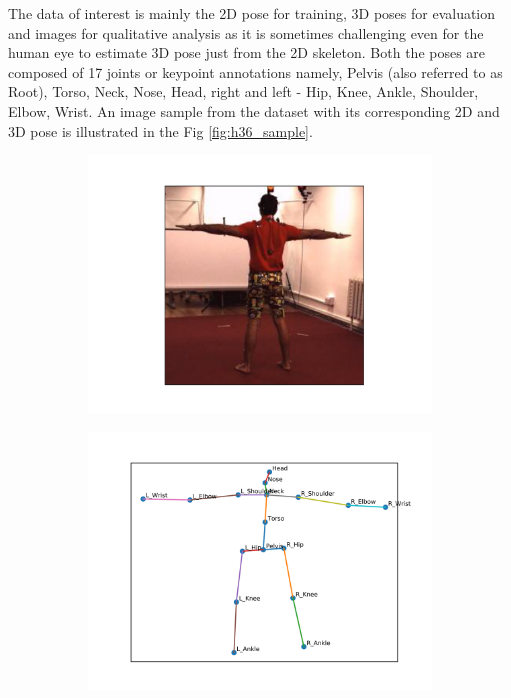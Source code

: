 The data of interest is mainly the 2D pose for training, 3D poses for evaluation and images for qualitative analysis as it is sometimes challenging even for the human eye to estimate 3D pose just from the 2D skeleton. Both the poses are composed of 17 joints or keypoint annotations namely, Pelvis (also referred to as Root), Torso, Neck, Nose, Head, right and left - Hip, Knee, Ankle, Shoulder, Elbow, Wrist. An image sample from the dataset with its corresponding 2D and 3D pose is illustrated in the Fig \ref{fig:h36_sample}. 

\begin{figure}
    \centering
    \begin{subfigure}[b]{0.3\textwidth}
        \centering
        \includegraphics[width=\textwidth]{figures/h36_viz/h36image.png}
        \caption{}
    \end{subfigure}
    \hfill
    \begin{subfigure}[b]{0.3\textwidth}
        \centering
        \includegraphics[width=\textwidth]{figures/h36_viz/h362d.png}

\end{subfigure}
\end{figure}
